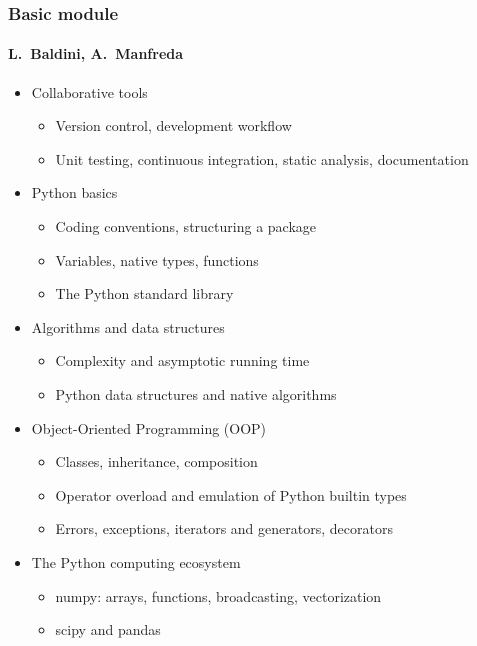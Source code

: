 \documentclass[9pt]{beamer}
\begin{document}
\begin{frame}
  \frametitle{Basic module}
  \framesubtitle{L.~Baldini, A.~Manfreda}
  \begin{itemize}
  \item Collaborative tools
    \begin{itemize}
    \item Version control, development workflow
    \item Unit testing, continuous integration, static analysis, documentation
    \end{itemize}
  \item Python basics
    \begin{itemize}
    \item Coding conventions, structuring a package
    \item Variables, native types, functions
    \item The Python standard library
    \end{itemize}
  \item Algorithms and data structures
    \begin{itemize}
    \item Complexity and asymptotic running time
    \item Python data structures and native algorithms
    \end{itemize}
  \item Object-Oriented Programming (OOP)
    \begin{itemize}
    \item Classes, inheritance, composition
    \item Operator overload and emulation of Python builtin types
    \item Errors, exceptions, iterators and generators, decorators
    \end{itemize}
  \item The Python computing ecosystem
    \begin{itemize}
    \item numpy: arrays, functions, broadcasting, vectorization
    \item scipy and pandas
    \end{itemize}
  \end{itemize}
\end{frame}
\end{document}
